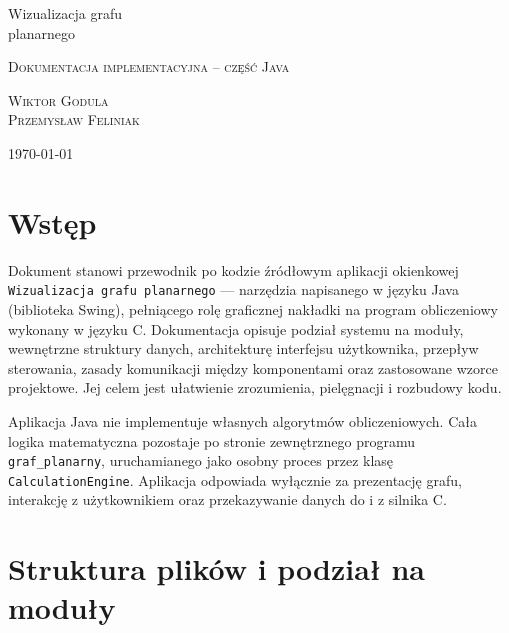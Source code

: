\documentclass[a4paper, 11pt]{article}
\begin{document}
\begin{titlepage}
  \centering
  \vspace*{4cm}

  {\fontsize{32}{38}\selectfont Wizualizacja grafu\\planarnego}

  \vspace{0.8cm}

  {\large\scshape\color{rulegray} Dokumentacja implementacyjna -- cz\k{e}\'s\'c Java}

  \vspace{1.2cm}

  {\small\scshape Wiktor Godula\\ Przemys\l{}aw Feliniak}

  \vfill

  {\small\color{rulegray} \today}

\end{titlepage}

\tableofcontents
\newpage

\section{Wstęp}

Dokument stanowi przewodnik po kodzie źródłowym aplikacji okienkowej
\texttt{Wizualizacja grafu planarnego} --- narzędzia napisanego w języku
Java (biblioteka Swing), pełniącego rolę graficznej nakładki na program
obliczeniowy wykonany w języku C. Dokumentacja opisuje podział systemu
na moduły, wewnętrzne struktury danych, architekturę interfejsu
użytkownika, przepływ sterowania, zasady komunikacji między komponentami
oraz zastosowane wzorce projektowe. Jej celem jest ułatwienie zrozumienia,
pielęgnacji i rozbudowy kodu.

Aplikacja Java nie implementuje własnych algorytmów obliczeniowych.
Cała logika matematyczna pozostaje po stronie zewnętrznego
programu \texttt{graf\_planarny}, uruchamianego jako osobny proces
przez klasę \texttt{CalculationEngine}. Aplikacja odpowiada wyłącznie
za prezentację grafu, interakcję z użytkownikiem oraz przekazywanie
danych do i z silnika C.

\section{Struktura plików i podział na moduły}
\end{document}
